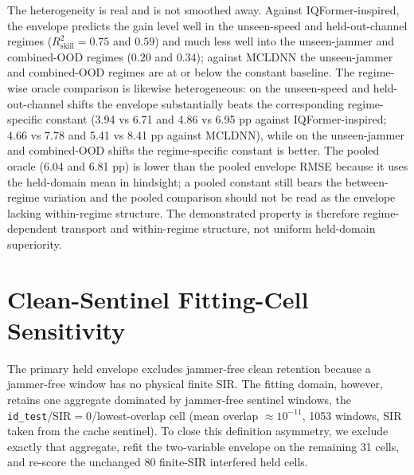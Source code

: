 \documentclass[letterpaper,onecolumn,11pt,journal]{IEEEtran}
\begin{document}
The heterogeneity is real and is not smoothed away. Against
IQFormer-inspired, the envelope predicts the gain level well in the
unseen-speed and held-out-channel regimes ($R^2_{\mathrm{skill}}=0.75$ and
$0.59$) and much less well into the unseen-jammer and combined-OOD regimes
($0.20$ and $0.34$); against MCLDNN the unseen-jammer and combined-OOD regimes
are at or below the constant baseline. The regime-wise oracle comparison is
likewise heterogeneous: on the unseen-speed and held-out-channel shifts the
envelope substantially beats the corresponding regime-specific constant
(3.94 vs 6.71 and 4.86 vs 6.95 pp against IQFormer-inspired; 4.66 vs 7.78
and 5.41 vs 8.41 pp against MCLDNN), while on the unseen-jammer and
combined-OOD shifts the regime-specific constant is better. The pooled oracle
(6.04 and 6.81 pp) is lower than the pooled envelope RMSE because it
uses the held-domain mean in hindsight; a pooled constant still bears the
between-regime variation and the pooled comparison should not be read as the
envelope lacking within-regime structure. The demonstrated property is
therefore regime-dependent transport and within-regime structure, not uniform
held-domain superiority.

\section{Clean-Sentinel Fitting-Cell Sensitivity}
The primary held envelope excludes jammer-free clean retention because a
jammer-free window has no physical finite SIR. The fitting domain, however,
retains one aggregate dominated by jammer-free sentinel windows, the
\texttt{id\_test}/SIR$=0$/lowest-overlap cell (mean overlap
$\approx10^{-11}$, 1053 windows, SIR taken from the cache sentinel). To
close this definition asymmetry, we exclude exactly that aggregate, refit
the two-variable envelope on the remaining 31 cells, and re-score the
unchanged 80 finite-SIR interfered held cells.
\end{document}
